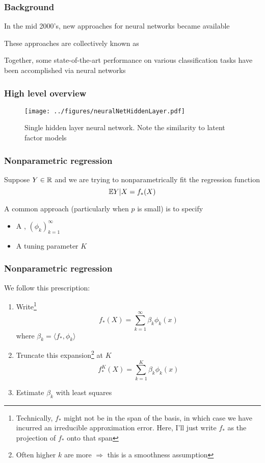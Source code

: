\documentclass[12pt]{beamer}
\begin{document}
\begin{frame}[fragile]
\frametitle{Background}
In the mid 2000's, new approaches for  neural networks became available

\vsp
These approaches are collectively known as 

\vsp
Together, some state-of-the-art performance on various classification tasks have been accomplished via
neural networks
\end{frame}

\begin{frame}[fragile]
\frametitle{High level overview}
\begin{figure}
\centering
\texttt{[image: ../figures/neuralNetHiddenLayer.pdf]}
\caption{Single hidden layer neural network.  Note the similarity to latent factor models}
\end{figure}
\end{frame}


\begin{frame}[fragile]
\frametitle{Nonparametric regression}
Suppose $Y \in \mathbb{R}$ and we are trying to nonparametrically fit the regression function
\[
\mathbb{E} Y|X = f_*(X)
\]

\vsp
A common approach (particularly when $p$ is small) is to specify 
\begin{itemize}
\item A , $(\phi_k)_{k=1}^\infty$
\item A tuning parameter $K$
\end{itemize}
\end{frame}


\begin{frame}[fragile]
\frametitle{Nonparametric regression}


We follow this prescription:

\begin{enumerate}
\item Write\footnote{Technically, $f_*$ might not be in the span of the basis, in which case we have incurred
an irreducible approximation error.  Here, I'll just write $f_*$ as the projection of $f_*$ onto that span}
\[
f_*(X) =\sum_{k=1}^\infty \beta_k \phi_k(x)
\]
where $\beta_k = \langle f_*, \phi_k \rangle$
\item Truncate this expansion\footnote{Often higher $k$ are more  $\Rightarrow$ this is a smoothness assumption} at $K$
\[
f_*^K(X) =\sum_{k=1}^K \beta_k \phi_k(x)
\]
\item Estimate $\beta_k$ with least squares 
\end{enumerate}
\end{frame}
\end{document}
